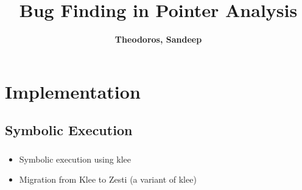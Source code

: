 \documentclass[mathserif,10pt]{beamer}
\title[Bug Finding in Pointer Analysis]{Bug Finding in Pointer Analysis}
\author[]{{\textbf{Theodoros, Sandeep}} }
\newcommand{\cmt}[1]{}
\begin{document}
  \begin{frame}
  \titlepage
  \end{frame}



\section{Implementation}
\subsection{Symbolic Execution}
\frame
{
  \frametitle{\subsecname}
  \begin{itemize}
    \item Symbolic execution using klee  
    \item Migration from Klee to Zesti (a variant of klee) 
    \cmt{
      To mitigate the path explosion problem, ZESTI carefully chooses divergent
        paths via two mechanisms: (1) it only diverges close to sensitive
        instructions (memory accesses and divisions.), i.e instructions that
        might contain a bug, and (2) it chooses the divergence points in order
        of increasing distance from the sensitive instruction. The key idea
        behind this approach is to exercise sensitive instructions on slightly
        different paths, with the goal of triggering a bug if the respective
        instructions contain one.  ZESTI identifies sensitive instructions
        dynamically while running the concrete input.  
    } 
  \end{itemize} 
}
\end{document}
